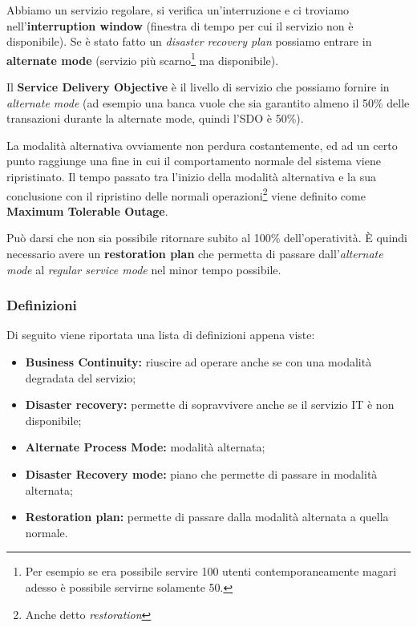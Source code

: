 Abbiamo un servizio regolare, si verifica un'interruzione e ci troviamo
nell'\textbf{interruption window} (finestra di tempo per cui il servizio non è
disponibile). Se è stato fatto un \textit{disaster recovery plan}
possiamo entrare in \textbf{alternate mode} (servizio più scarno\footnote{Per
esempio se era possibile servire 100 utenti contemporaneamente magari adesso
\`e possibile servirne solamente 50.} ma disponibile).

Il \textbf{Service Delivery Objective} è il livello di servizio che possiamo
fornire in \textit{alternate mode} (ad esempio una banca vuole che sia
garantito almeno il 50\% delle transazioni durante la alternate mode, quindi
l'SDO è 50\%).

La modalità alternativa ovviamente non perdura costantemente, ed ad un certo
punto raggiunge una fine in cui il comportamento normale del sistema viene
ripristinato. Il tempo passato tra l'inizio della modalità alternativa e la
sua conclusione con il ripristino delle normali operazioni\footnote{Anche
detto \textit{restoration}} viene definito come \textbf{Maximum Tolerable
Outage}.

Può darsi che non sia possibile ritornare subito al 100\% dell'operatività.
È quindi necessario avere un \textbf{restoration plan} che permetta di passare
dall'\textit{alternate mode} al \textit{regular service mode} nel minor tempo
possibile.

\subsubsection{Definizioni}

Di seguito viene riportata una lista di definizioni appena viste:

\begin{itemize}
 \item \textbf{Business Continuity:} riuscire ad operare anche se con una modalità degradata del servizio;
 \item \textbf{Disaster recovery:} permette di sopravvivere anche se il servizio IT è non disponibile;
 \item \textbf{Alternate Process Mode:} modalità alternata;
 \item \textbf{Disaster Recovery mode:} piano che permette di passare in modalità alternata;
 \item \textbf{Restoration plan:} permette di passare dalla modalità alternata a quella normale.
\end{itemize}

